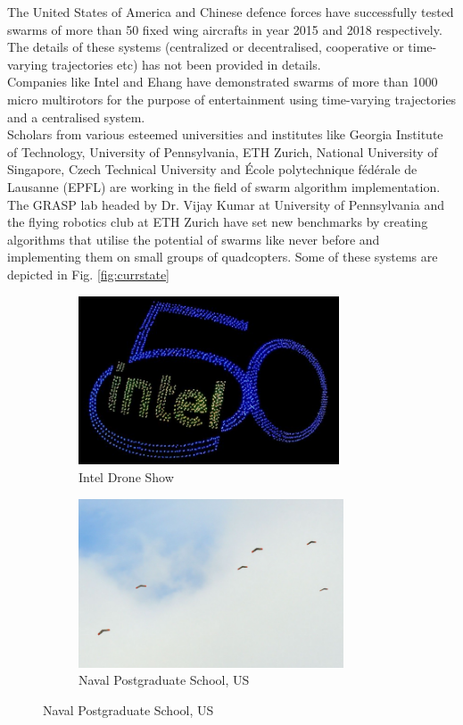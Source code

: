 \begin{spacing}{2}
The United States of America and Chinese defence forces have successfully tested swarms of more than 50 fixed wing aircrafts in year 2015 and 2018 respectively. The details of these systems (centralized or decentralised, cooperative or time-varying trajectories etc) has not been provided in details. \\Companies like Intel and Ehang have demonstrated swarms of more than 1000 micro multirotors for the purpose of entertainment using time-varying trajectories and a centralised system. \\Scholars from various esteemed universities and institutes like Georgia Institute of Technology, University of Pennsylvania, ETH Zurich, National University of Singapore, Czech Technical University and École polytechnique fédérale de Lausanne (EPFL) are working in the field of swarm algorithm implementation. The GRASP lab headed by Dr. Vijay Kumar at University of Pennsylvania and the flying robotics club at ETH Zurich have set new benchmarks by creating algorithms that utilise the potential of swarms like never before and implementing them on small groups of quadcopters. Some of these systems are depicted in Fig. \ref{fig:currstate}
\begin{figure}[h]
\begin{subfigure}{0.5\textwidth}
\includegraphics[width=0.9\linewidth, height=5cm]{image/intel.png}
\caption{Intel Drone Show}
\end{subfigure}
\begin{subfigure}{0.5\textwidth}
\includegraphics[width=0.9\linewidth, height=5cm]{image/navalps.png}
\caption{Naval Postgraduate School, US}
\end{subfigure}
 

\end{figure}
\end{spacing}
